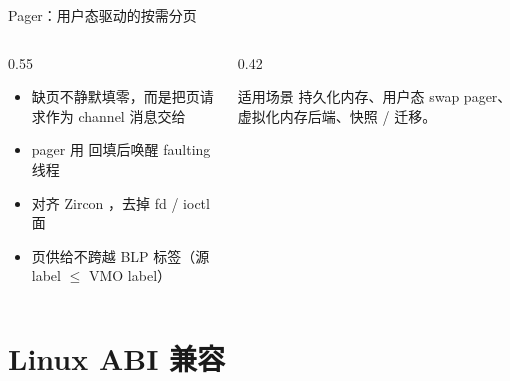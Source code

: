 \documentclass[aspectratio=1610]{beamer}
\begin{document}
\begin{frame}{Pager：用户态驱动的按需分页}
    \begin{columns}[t]
        \begin{column}{0.55\textwidth}
            \begin{itemize}
                \item {} 缺页不静默填零，而是把页请求作为 channel 消息交给 
                \item pager 用  回填后唤醒 faulting 线程
                \item 对齐 Zircon ，去掉 fd / ioctl 面
                \item 页供给不跨越 BLP 标签（源 label $\le$ VMO label）
            \end{itemize}
            \vspace{0.3em}
        \end{column}
        \begin{column}{0.42\textwidth}
            \vspace{0.3em}
            \begin{block}{适用场景}
                \footnotesize 持久化内存、用户态 swap pager、虚拟化内存后端、快照 / 迁移。
            \end{block}
        \end{column}
    \end{columns}
\end{frame}

\renewcommand{\azsectionsummary}{%
    361 个 syscall 调度表全表覆盖、无空位；io\_uring / landlock / pidfd / mseal 等现代机制已实现；%
    动态链接 musl 程序直接运行。}
\section{Linux ABI 兼容}
\end{document}
